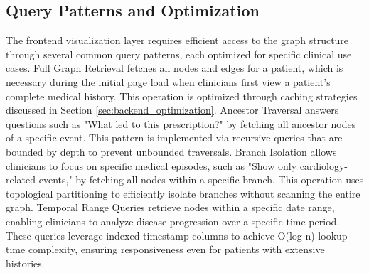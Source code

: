 \subsection{Query Patterns and Optimization}
\label{subsec:graph_queries}

The frontend visualization layer requires efficient access to the graph
structure through several common query patterns, each optimized for specific
clinical use cases. Full Graph Retrieval fetches all nodes and edges for a
patient, which is necessary during the initial page load when clinicians first
view a patient's complete medical history. This operation is optimized through
caching strategies discussed in Section \ref{sec:backend_optimization}.
Ancestor Traversal answers questions such as "What led to this prescription?"
by fetching all ancestor nodes of a specific event. This pattern is implemented
via recursive queries that are bounded by depth to prevent unbounded
traversals. Branch Isolation allows clinicians to focus on specific medical
episodes, such as "Show only cardiology-related events," by fetching all nodes
within a specific branch. This operation uses topological partitioning to
efficiently isolate branches without scanning the entire graph. Temporal Range
Queries retrieve nodes within a specific date range, enabling clinicians to
analyze disease progression over a specific time period. These queries leverage
indexed timestamp columns to achieve O(log n) lookup time complexity, ensuring
responsiveness even for patients with extensive histories.

